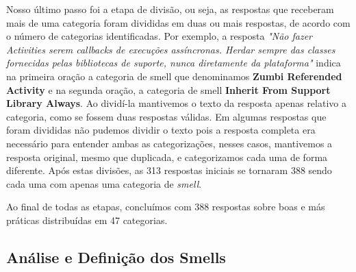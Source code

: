 

Nosso último passo foi a etapa de divis\~ao, ou seja, as respostas que receberam mais de uma categoria foram divididas em duas ou mais respostas, de acordo com o n\'umero de categorias identificadas. Por exemplo, a resposta \textit{"N\~ao fazer Activities serem callbacks de execu\c{c}\~oes ass\'incronas. Herdar sempre das classes fornecidas pelas bibliotecas de suporte, nunca diretamente da plataforma"} indica na primeira ora\c{c}\~ao a categoria de smell que denominamos \textbf{Zumbi Referended Activity} e na segunda ora\c{c}\~ao, a categoria de smell \textbf{Inherit From Support Library Always}. Ao divid\'i-la mantivemos o texto da resposta apenas relativo a categoria, como se fossem duas respostas v\'alidas. Em algumas respostas que foram divididas n\~ao pudemos dividir o texto pois a resposta completa era necess\'ario para entender ambas as categoriza\c{c}\~oes, nesses casos, mantivemos a resposta original, mesmo que duplicada, e categorizamos cada uma de forma diferente. Ap\'os estas divis\~oes, as 313 respostas iniciais se tornaram 388 sendo cada uma com apenas uma categoria de \textit{smell}. 

Ao final de todas as etapas, conclu\'imos com 388 respostas sobre boas e m\'as pr\'aticas distribu\'idas em 47 categorias. 

\subsection{An\'alise e Defini\c{c}\~ao dos Smells}
\label{sub:analisys-definition}


